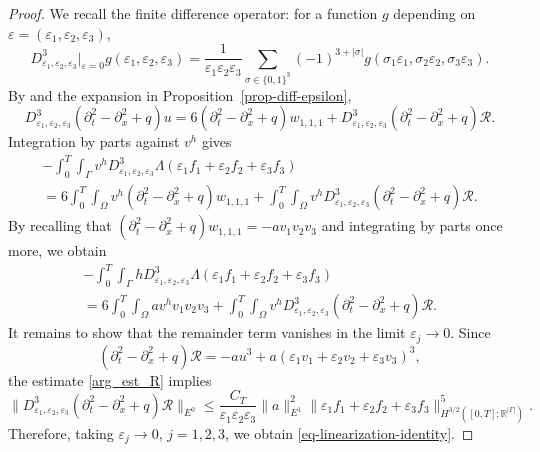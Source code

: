 \documentclass[11pt]{amsart}
\theoremstyle{definition}
\theoremstyle{plain}
\numberwithin{equation}{section}
\begin{document}
\begin{proof}
We recall the finite difference operator: for a function $g$ depending on $\varepsilon = (\varepsilon_1,\varepsilon_2,\varepsilon_3)$,
\begin{equation*}
    D^3_{\varepsilon_1,\varepsilon_2,\varepsilon_3}\big|_{\varepsilon = 0}  g(\varepsilon_1,\varepsilon_2,\varepsilon_3)
    = \frac{1}{\varepsilon_1\varepsilon_2\varepsilon_3}\sum_{\sigma\in\{0,1\}^3} (-1)^{3+|\sigma|} g(\sigma_1 \varepsilon_1,\sigma_2 \varepsilon_2,\sigma_3 \varepsilon_3).
\end{equation*}
By \cite[Lemma 10]{LassasLiimatainenPotenciano-MachadoTyni} and the expansion in Proposition~\ref{prop-diff-epsilon},
\begin{equation*}
    D^3_{\varepsilon_1,\varepsilon_2,\varepsilon_3} (\partial_{t}^2 -\partial_x^2 + q)u = 6  (\partial_{t}^2 -\partial_x^2 + q) w_{1,1,1} + D^3_{\varepsilon_1,\varepsilon_2,\varepsilon_3} (\partial_{t}^2 -\partial_x^2 + q)\mathcal{R}.
\end{equation*}
Integration by parts against $v^h$ gives
\begin{multline*}
     - \int_0^T \int_{\Gamma} v^h D^3_{\varepsilon_1,\varepsilon_2,\varepsilon_3} \Lambda(\varepsilon_1f_1 + \varepsilon_2f_2 + \varepsilon_3f_3)\\
     = 6\int_0^T\int_\Omega v^h (\partial_{t}^2 -\partial_x^2 + q) w_{1,1,1} + \int_0^T\int_\Omega v^h  D^3_{\varepsilon_1,\varepsilon_2,\varepsilon_3} (\partial_{t}^2 -\partial_x^2 + q)\mathcal{R}.
\end{multline*}
By recalling that $(\partial_t^2 - \partial_x^2 + q) w_{1,1,1} = -a v_1 v_2 v_3$ and integrating by parts once more, we obtain
\begin{multline*}
     - \int_0^T \int_{\Gamma} h  D^3_{\varepsilon_1,\varepsilon_2,\varepsilon_3} \Lambda(\varepsilon_1f_1 + \varepsilon_2f_2 + \varepsilon_3f_3)\\
     = 6\int_0^T\int_\Omega a  v^h v_1 v_2 v_3 + \int_0^T\int_\Omega v^h  D^3_{\varepsilon_1,\varepsilon_2,\varepsilon_3} (\partial_{t}^2 -\partial_x^2 + q)\mathcal{R}.
\end{multline*}
It remains to show that the remainder term vanishes in the limit $\varepsilon_j \to 0$.
Since 
\begin{equation*}
    (\partial_{t}^2 -\partial_x^2 + q)\mathcal{R} = -au^3 + a(\varepsilon_1 v_1+\varepsilon_2 v_2+\varepsilon_3 v_3)^3,
\end{equation*}
the estimate \eqref{arg_est_R} implies
\begin{equation*}
    \big\|D^3_{\varepsilon_1,\varepsilon_2,\varepsilon_3} (\partial_{t}^2 -\partial_x^2 + q)\mathcal{R}\big\|_{E^0} \leq   \frac{C_T}{\varepsilon_1\varepsilon_2\varepsilon_3} \|a\|_{E^1}^2 \|\varepsilon_1f_1 + \varepsilon_2f_2 + \varepsilon_3f_3\|_{H^{3/2}([0,T];\mathbb{R}^{|\Gamma|})}^5.
\end{equation*}
Therefore, taking $\varepsilon_j \rightarrow 0$, $j=1,2,3$, we obtain \eqref{eq-linearization-identity}.
\end{proof}
\end{document}

